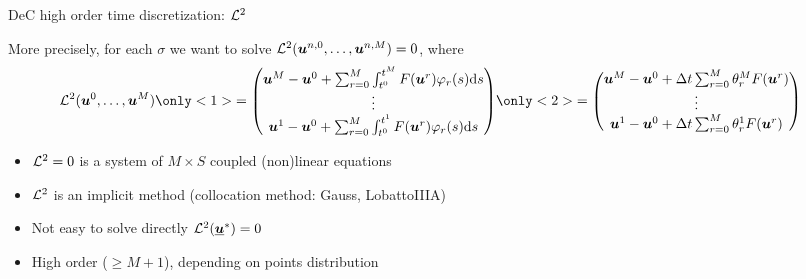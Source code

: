 \documentclass[9pt,compress,t,aspectratio=169]{beamer}
\begin{document}
\begin{frame}{DeC high order time discretization: $\mathcal{L}^2$}
	\begin{minipage}{0.77\textwidth}
		More precisely, for each $\sigma$ we want to solve $\mathcal{L}^2 (\boldsymbol{u}^{n,0},\dots,\boldsymbol{u}^{n,M})=0$, where 
		{\begin{align*}
			\L^2(\bc^0, \dots, \bc^M) &
			\only<1>{=
			\begin{pmatrix}
				\bc^M-\bc^0 +\sum_{r=0}^M \int_{t^0}^{t^M} F(\bc^r) \varphi_r(s) \diff s\\
				\vdots\\
				\bc^1-\bc^0 + \sum_{r=0}^M \int_{t^0}^{t^1} F(\bc^r) \varphi_r(s) \diff s
			\end{pmatrix}
		}
			\only<2>{=
			\begin{pmatrix}
				\bc^M-\bc^0 +\Delta t \sum_{r=0}^M \theta_r^M F(\bc^r) \\
				\vdots\\
				\bc^1-\bc^0 + \Delta t \sum_{r=0}^M  \theta_r^1  F(\bc^r) 
			\end{pmatrix}}
		\end{align*}
	}
		\begin{itemize}
			\item $\mathcal{L}^2=0$ is a system of $M \times S$ coupled (non)linear equations
			\item $\mathcal{L}^2$ is an implicit method (collocation method: Gauss, LobattoIIIA)
			\item Not easy to solve directly $\mathcal{L}^2(\underline{\boldsymbol{u}}^*)=0$
			\item High order ($\geq M+1$), depending on points distribution
		\end{itemize}
		
	\end{minipage}\hfill
	\begin{minipage}{0.2\textwidth}
		\begin{figure}[h]
			\centering
		\end{figure}
	\end{minipage}
\end{frame}
\end{document}

